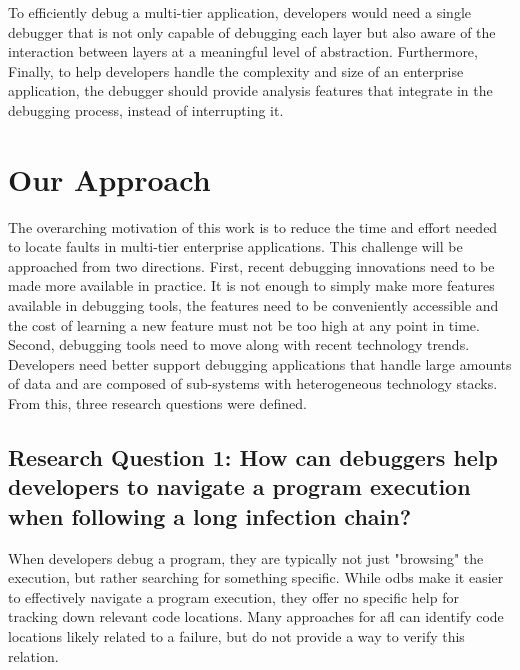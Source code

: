 To efficiently debug a multi-tier application, developers would need a single debugger that is not only capable of debugging each layer but also aware of the interaction between layers at a meaningful level of abstraction.
Furthermore, 
Finally, to help developers handle the complexity and size of an enterprise application, the debugger should provide analysis features that integrate in the debugging process, instead of interrupting it.

\section{Our Approach} %

The overarching motivation of this work is to reduce the time and effort needed to locate faults in multi-tier enterprise applications. %
This challenge will be approached from two directions.
First, recent debugging innovations need to be made more available in practice.
It is not enough to simply make more features available in debugging tools, the features need to be conveniently accessible and the cost of learning a new feature must not be too high at any point in time.
Second, debugging tools need to move along with recent technology trends.
Developers need better support debugging applications that handle large amounts of data and are composed of sub-systems with heterogeneous technology stacks.
From this, three research questions were defined.

\newcommand{\RQ}[1]{\subsection*{#1}}

\RQ{Research Question 1: How can debuggers help developers to navigate a program execution when following a long infection chain?}

When developers debug a program, they are typically not just "browsing" the execution, but rather searching for something specific.
While \acp{odb} make it easier to effectively navigate a program execution, they offer no specific help for tracking down relevant code locations.
Many approaches for \ac{afl} can identify code locations likely related to a failure, but do not provide a way to verify this relation.

